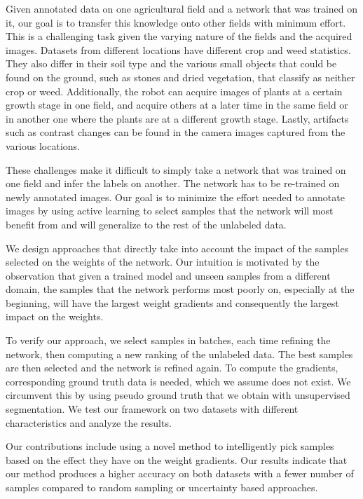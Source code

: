 \documentclass[letterpaper, 10 pt, conference]{ieeeconf}  %
\begin{document}
Given annotated data on one agricultural field and a network that was trained on it, our goal is to transfer this knowledge onto other fields with minimum effort. This is a challenging task given the varying nature of the fields and the acquired images. Datasets from different locations have different crop and weed statistics. They also differ in their soil type and the various small objects that could be found on the ground, such as stones and dried vegetation, that classify as neither crop or weed. Additionally, the robot can acquire images of plants at a certain growth stage in one field, and acquire others at a later time in the same field or in another one where the plants are at a different growth stage. Lastly, artifacts such as contrast changes can be found in the camera images captured from the various locations. 

These challenges make it difficult to simply take a network that was trained on one field and infer the labels on another. The network has to be re-trained on newly annotated images. Our goal is to minimize the effort needed to annotate images by using active learning to select samples that the network will most benefit from and will generalize to the rest of the unlabeled data. 

We design approaches that directly take into account the impact of the samples selected on the weights of the network. Our intuition is motivated by the observation that given a trained model and unseen samples from a different domain, the samples that the network performs most poorly on, especially at the beginning, will have the largest weight gradients and consequently the largest impact on the weights.  

To verify our approach, we select samples in batches, each time refining the network, then computing a new ranking of the unlabeled data. The best samples are then selected and the network is refined again. To compute the gradients, corresponding ground truth data is needed, which we assume does not exist. We circumvent this by using pseudo ground truth that we obtain with unsupervised segmentation. We test our framework on two datasets with different characteristics and analyze the results.

Our contributions include using a novel method to intelligently pick samples based on the effect they have on the weight gradients. Our results indicate that our method produces a higher accuracy on both datasets with a fewer number of samples compared to random sampling or uncertainty based approaches.
\end{document}
